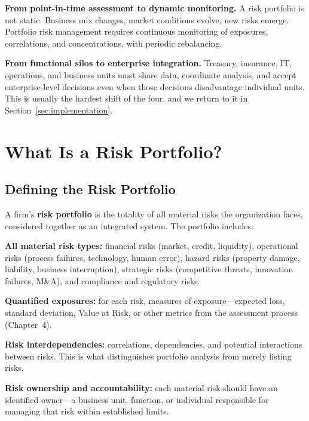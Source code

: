 \documentclass[11pt,openany]{book}
\begin{document}
\textbf{From point-in-time assessment to dynamic monitoring.} A risk portfolio
is not static. Business mix changes, market conditions evolve, new risks
emerge. Portfolio risk management requires continuous monitoring of exposures,
correlations, and concentrations, with periodic rebalancing.

\textbf{From functional silos to enterprise integration.} Treasury, insurance,
IT, operations, and business units must share data, coordinate analysis, and
accept enterprise-level decisions even when those decisions disadvantage
individual units. This is usually the hardest shift of the four, and we return
to it in Section~\ref{sec:implementation}.

\section{What Is a Risk Portfolio?}
\label{sec:what-is-portfolio}

\subsection{Defining the Risk Portfolio}
\label{subsec:defining-portfolio}

A firm's \textbf{risk portfolio} is the totality of all material risks the
organization faces, considered together as an integrated system. The portfolio
includes:

\textbf{All material risk types:} financial risks (market, credit, liquidity),
operational risks (process failures, technology, human error), hazard risks
(property damage, liability, business interruption), strategic risks
(competitive threats, innovation failures, M\&A), and compliance and
regulatory risks.

\textbf{Quantified exposures:} for each risk, measures of exposure---expected
loss, standard deviation, Value at Risk, or other metrics from the assessment
process (Chapter~4).

\textbf{Risk interdependencies:} correlations, dependencies, and potential
interactions between risks. This is what distinguishes portfolio analysis from
merely listing risks.

\textbf{Risk ownership and accountability:} each material risk should have an
identified owner---a business unit, function, or individual responsible for
managing that risk within established limits.
\end{document}

